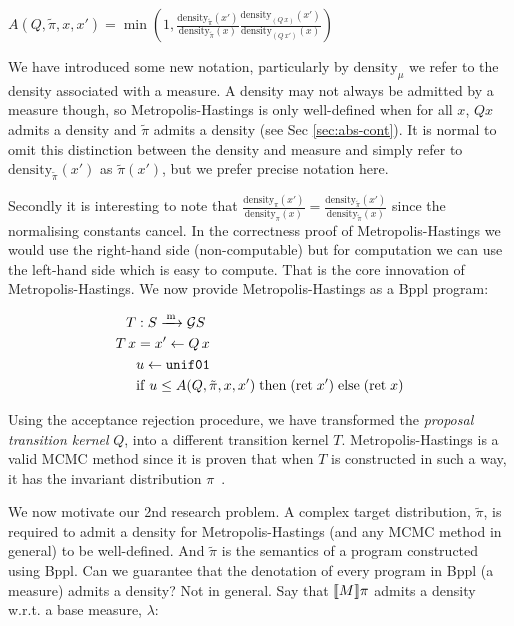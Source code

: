$A(Q, \tilde{\pi}, x, x') = \min\left(1, \frac{\mathrm{density}_{\tilde{\pi}}(x')}{\mathrm{density}_{\tilde{\pi}}(x)} \frac{\mathrm{density}_{(Q\, x)}(x')}{\mathrm{density}_{(Q\, x')}(x)} \right)$

We have introduced some new notation, particularly by $\mathrm{density}_\mu$ we refer to the density associated with a measure. A density may not always be admitted by a measure though, so
Metropolis-Hastings is only well-defined when for all $x$, $Q x$ admits a density and $\tilde{\pi}$ admits a density (see Sec \ref{sec:abs-cont}). It is normal to omit this distinction
between the density and measure and simply refer to $\mathrm{density}_{\tilde{\pi}}(x')$ as $\tilde{\pi}(x')$, but we prefer precise notation here.

Secondly it is interesting to note that
$\frac{\mathrm{density}_{\pi}(x')}{\mathrm{density}_{\pi}(x)} = \frac{\mathrm{density}_{\tilde{\pi}}(x')}{\mathrm{density}_{\tilde{\pi}}(x)}$ since the normalising constants
cancel. In the correctness proof of Metropolis-Hastings we would use the right-hand side (non-computable) but for computation we can use the left-hand side which is easy to compute. That
is the core innovation of Metropolis-Hastings. We now provide Metropolis-Hastings as a Bppl program:

\[
\begin{aligned}
T &: S \xrightarrow{\,\mathrm{m}\,} \mathcal{G} S \\
T\,x &= x' \leftarrow Q\,x \\
&u \leftarrow \texttt{unif01} \\
&\mathrm{if}\;u \leq A(Q, \tilde{\pi}, x, x')\;\mathrm{then}\;(\mathrm{ret}\;x')\;\mathrm{else}\;(\mathrm{ret}\;x)
\end{aligned}
\]

Using the acceptance rejection procedure, we have transformed the \emph{proposal transition kernel} $Q$, into a different transition kernel $T$. Metropolis-Hastings is a valid MCMC
method since it is proven that when $T$ is constructed in such a way, it has the invariant distribution $\pi$~\citep{}.

We now motivate our 2nd research problem. A complex target distribution, $\tilde{\pi}$, is required to admit a density for
Metropolis-Hastings (and any MCMC method in general) to be well-defined. And $\tilde{\pi}$ is the semantics of a program constructed using Bppl. Can we guarantee that the denotation of every program in Bppl (a measure) admits a density?
Not in general. Say that $\llbracket M \rrbracket \pi$ admits a density w.r.t. a base measure, $\lambda$:

